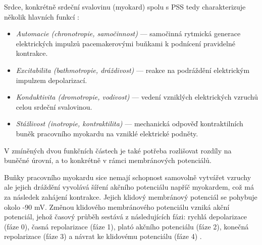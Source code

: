 Srdce, konkrétně srdeční svalovinu (myokard) spolu s PSS tedy charakterizuje
několik hlavních funkcí \cite{Stejfa2006}:
\begin{itemize}
	\item \textit{Automacie (chronotropie, samočinnost)} --- samočinná rytmická
	      generace elektrických impulzů pacemakerovými buňkami k podnícení
	      pravidelné kontrakce.
	\item \textit{Excitabilita (bathmotropie, dráždivost)} --- reakce na
	      podráždění elektrickým impulzem depolarizací.
	\item \textit{Konduktivita (dromotropie, vodivost)} --- vedení vzniklých
	      elektrických vzruchů celou srdeční svalovinou.
	\item \textit{Stážlivost (inotropie, kontraktilita)} --- mechanická odpověď
	      kontraktilních buněk pracovního myokardu na vzniklé elektrické
	      podněty.
\end{itemize}

V zmíněných dvou funkčních částech je také potřeba rozlišovat rozdíly na buněčné
úrovní, a to konkrétně v rámci membránových potenciálů.

Buňky pracovního myokardu sice nemají schopnost samovolně vytvářet vzruchy ale
jejich dráždění vyvolává šíření akčního potenciálu napříč myokardem, což má za
následek zahájení kontrakce. Jejich klidový membránový potenciál se pohybuje
okolo -90 mV. Změnou klidového membránového potenciálu vzniká akční potenciál,
jehož časový průběh sestává z následujících fázi: rychlá depolarizace (fáze 0),
časná repolarizace (fáze 1), plató akčního potenciálu (fáze 2), konečná
repolarizace (fáze 3) a návrat ke klidovému potenciálu (fáze 4)
\cite{Petrek2019}.

